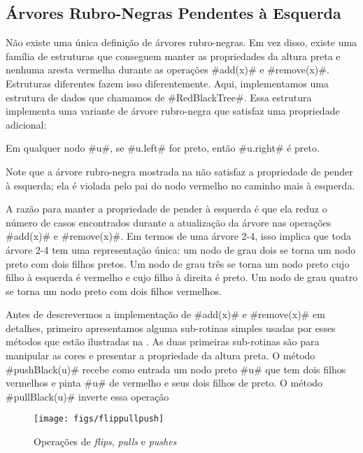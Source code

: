 \subsection{Árvores Rubro-Negras Pendentes à Esquerda}

%
%
Não existe uma única definição de 
árvores rubro-negras. Em vez disso, existe uma família
de estruturas que conseguem manter as propriedades da altura preta
e nenhuma aresta vermelha 
durante as operações #add(x)# e #remove(x)#. Estruturas diferentes fazem isso diferentemente. 
Aqui, implementamos uma estrutura de dados que chamamos de 
#RedBlackTree#.
%
Essa estrutura implementa uma variante de árvore rubro-negra que satisfaz
uma propriedade adicional:
\begin{prp}
  Em qualquer nodo #u#, se #u.left# for preto, então #u.right# é preto. 
\end{prp}
Note que a árvore rubro-negra mostrada na 
  não satisfaz a propriedade de pender 
à esquerda; 
ela é violada pelo pai do nodo vermelho no caminho mais à esquerda.

A razão para manter a propriedade de pender à esquerda é que ela reduz
o número de casos encontrados durante a atualização da árvore nas operações
#add(x)#
e #remove(x)#.  Em termos de uma árvore 2-4, isso implica que toda árvore 2-4 tem uma representação única: um nodo de grau dois se torna um nodo preto com dois filhos pretos.
Um nodo de grau três se torna um nodo preto cujo filho à esquerda é vermelho 
e cujo filho à direita é preto.
Um nodo de grau quatro se torna um nodo preto com dois filhos vermelhos.

Antes de descrevermos a implementação de 
 #add(x)# e #remove(x)# em detalhes, primeiro apresentamos alguma sub-rotinas
 simples usadas por esses métodos que estão ilustradas na 
 .  As duas primeiras sub-rotinas são para manipular
 as cores e presentar a propriedade da altura preta.
 O método #pushBlack(u)# recebe como entrada um nodo preto #u#
que tem dois filhos vermelhos e pinta #u# de vermelho e seus dois filhos de preto.
O método #pullBlack(u)# inverte essa operação

\begin{figure}
  \begin{center}
    \texttt{[image: figs/flippullpush]}
  \end{center}
  \caption{Operações de \emph{flips}, \emph{pulls} e \emph{pushes}}
\end{figure}

